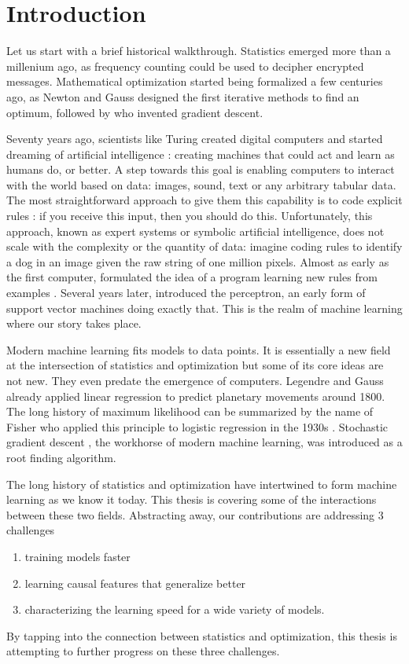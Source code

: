 \setcounter{theorem}{0}

\chapter{Introduction}

Let us start with a brief historical walkthrough.
Statistics emerged more than a millenium ago, as frequency counting could be used to decipher encrypted messages.
Mathematical optimization started being formalized a few centuries ago, as
Newton and Gauss designed the first iterative methods to find an optimum, followed by \citet{cauchy1847methode}  who invented gradient descent.
 
Seventy years ago, scientists like Turing created  digital computers and started dreaming of artificial intelligence : creating machines that could act and learn as humans do, or better.
A step towards this goal is enabling computers to interact with the world based on data: images, sound, text or any arbitrary tabular data. 
The most straightforward approach to give them this capability is to code explicit rules : if you receive this input, then you should do this. 
Unfortunately, this approach, known as expert systems or symbolic artificial intelligence, does not scale with the complexity or the quantity of data:
imagine coding rules to identify a dog in an image given the raw string of one million pixels.  
Almost as early as the first computer,  \citet{turing1950computing} formulated the idea of a program learning new rules from examples \citep{muggleton2014alan}.
Several years later, \citet{rosenblatt1957perceptron} introduced the perceptron, an early form of support vector machines doing exactly that. 
This is the realm of machine learning where our story takes place.


Modern machine learning  fits models to data points. 
It is essentially a new field at the intersection of statistics and optimization
but some of its core ideas are not new.
They even predate the emergence of computers.
Legendre and Gauss already applied linear regression to predict planetary movements around 1800. 
The long history of maximum likelihood can be summarized by the name of Fisher who applied this principle to logistic regression in the 1930s \citep{stigler2007epic}.
Stochastic gradient descent \citep{robbins1951stochastic}, the workhorse of modern machine learning, was introduced as a root finding algorithm.

The long history of statistics and optimization have intertwined to form machine learning as we know it today.
This thesis is covering some of the interactions between these two fields.
Abstracting away, our contributions are  addressing 3 challenges
\begin{enumerate}
	\item training models faster
	\item learning causal features that generalize better
	\item characterizing the learning speed for a wide variety of models.
\end{enumerate}
By tapping into the connection between statistics and optimization, this thesis is attempting to further progress on these three challenges.

